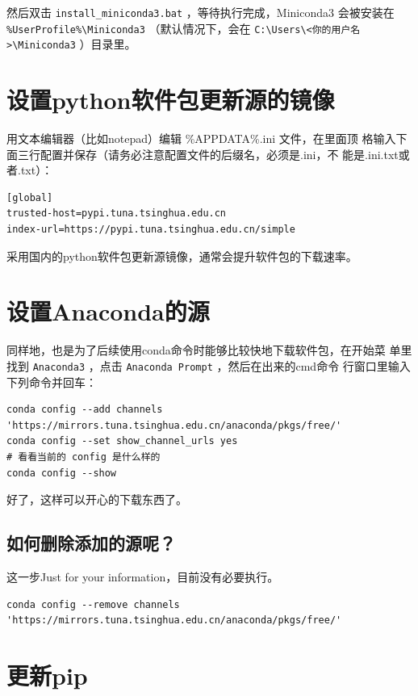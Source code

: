 \documentclass[12pt,a4paper]{article}
\begin{document}
然后双击 \texttt{install\_miniconda3.bat} ，等待执行完成，Miniconda3 会被安装在
\texttt{\%UserProfile\%\textbackslash{}Miniconda3} （默认情况下，会在 \texttt{C:\textbackslash{}Users\textbackslash{}<你的用户名>\textbackslash{}Miniconda3} ）目录里。

\section{设置python软件包更新源的镜像}
\label{sec:org4926427}

用文本编辑器（比如notepad）编辑 \%APPDATA\%\pip\pip.ini 文件，在里面顶
格输入下面三行配置并保存（请务必注意配置文件的后缀名，必须是.ini，不
能是.ini.txt或者.txt）：

\begin{verbatim}
[global]
trusted-host=pypi.tuna.tsinghua.edu.cn
index-url=https://pypi.tuna.tsinghua.edu.cn/simple
\end{verbatim}

采用国内的python软件包更新源镜像，通常会提升软件包的下载速率。

\section{设置Anaconda的源}
\label{sec:org3bb241c}

同样地，也是为了后续使用conda命令时能够比较快地下载软件包，在开始菜
单里找到 \texttt{Anaconda3} ，点击 \texttt{Anaconda Prompt} ，然后在出来的cmd命令
行窗口里输入下列命令并回车：

\begin{verbatim}
conda config --add channels 'https://mirrors.tuna.tsinghua.edu.cn/anaconda/pkgs/free/'
conda config --set show_channel_urls yes
# 看看当前的 config 是什么样的
conda config --show  
\end{verbatim}

好了，这样可以开心的下载东西了。

\subsection{如何删除添加的源呢？}
\label{sec:orgb0ade4d}

这一步Just for your information，目前没有必要执行。

\begin{verbatim}
conda config --remove channels 'https://mirrors.tuna.tsinghua.edu.cn/anaconda/pkgs/free/' 
\end{verbatim}

\section{更新pip}
\label{sec:orgeec1633}
\end{document}

